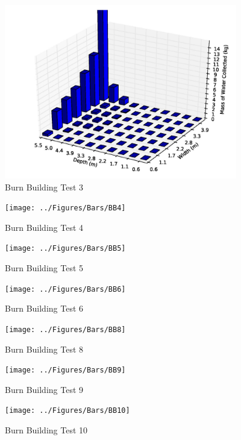 \documentclass[12pt,oneside]{book}
\begin{document}
\begin{figure}[!ht]
	\includegraphics[width=4in]{../Figures/Bars/BB3}
	\caption{Burn Building Test 3}
	\label{fig:Burn_Building_Test_3}
\end{figure}

\begin{figure}[!ht]
	\texttt{[image: ../Figures/Bars/BB4]}
	\caption{Burn Building Test 4}
	\label{fig:Burn_Building_Test_4}
\end{figure}

\begin{figure}[!ht]
	\texttt{[image: ../Figures/Bars/BB5]}
	\caption{Burn Building Test 5}
	\label{fig:Burn_Building_Test_5}
\end{figure}

\clearpage

\begin{figure}[!ht]
	\texttt{[image: ../Figures/Bars/BB6]}
	\caption{Burn Building Test 6}
	\label{fig:Burn_Building_Test_6}
\end{figure}

\begin{figure}[!ht]
	\texttt{[image: ../Figures/Bars/BB8]}
	\caption{Burn Building Test 8}
	\label{fig:Burn_Building_Test_8}
\end{figure}

\begin{figure}[!ht]
	\texttt{[image: ../Figures/Bars/BB9]}
	\caption{Burn Building Test 9}
	\label{fig:Burn_Building_Test_9}
\end{figure}

\begin{figure}[!ht]
	\texttt{[image: ../Figures/Bars/BB10]}
	\caption{Burn Building Test 10}
	\label{fig:Burn_Building_Test_10}
\end{figure}
\end{document}
